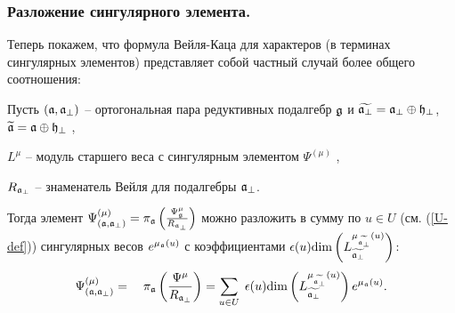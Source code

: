 \subsubsection{Разложение сингулярного элемента.}
\label{subsec:decomp-sing-element}

Теперь покажем, что формула Вейля-Каца для характеров (в терминах сингулярных элементов) представляет собой частный случай более общего соотношения:

\begin{lemma}
\label{lemma}
Пусть $\left( \mathfrak{a},\mathfrak{a}_{\perp} \right)$ -- ортогональная пара редуктивных подалгебр $\mathfrak{g}$ и  $\widetilde{\mathfrak{a}_{\perp}}=\mathfrak{a}_{\perp}\oplus \mathfrak{h}_{\perp }$, $\widetilde{\mathfrak{a}}=\mathfrak{a}\oplus\mathfrak{h}_{\perp }$ ,

$L^{\mu }$ -- модуль старшего веса с сингулярным элементом $\Psi ^{\left(\mu \right)}$ ,

$R_{\mathfrak{a}_{\perp }}$ -- знаменатель Вейля для подалгебры $\mathfrak{a}_{\perp }$.

Тогда элемент  $\Psi ^{\left( \mu \right) }_{\left(  \mathfrak{a}, \mathfrak{a}_{\perp} \right)}=\pi _{\mathfrak{a}}\left( \frac{\Psi _{\mathfrak{g}}^{\mu }}{R_{\mathfrak{a}_{\perp }}}\right) $ можно разложить в сумму по  $u\in U$ (см. (\ref{U-def})) сингулярных весов $e^{\mu _{\mathfrak{a}}\left( u\right) }$ с коэффициентами $\epsilon (u)\mathrm{\dim}\left( L_{\widetilde{\mathfrak{a}_{\perp}}}^{\mu _{\widetilde{\mathfrak{a}_{\perp}}}\left( u\right) }\right) $:
\begin{equation}
\Psi ^{\left( \mu \right) }_{\left(  \af, \afb \right)}=\quad \pi _{\af}\left( \frac{\Psi^{\mu }}{R_{\af%
_{\perp }}}\right) =\sum_{u\in U}\;\epsilon (u)\mathrm{\dim }
\left( L_{\widetilde{\af_{\perp }}}^{\mu _{%
\widetilde{\af_{\perp }}}\left( u\right) }\right) e^{\mu _{\af}\left( u \right) }.
\end{equation}
\end{lemma}

